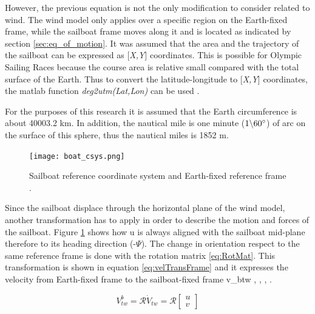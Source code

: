 However, the previous equation is not the only modification to consider related to wind. %
The wind model only applies over a specific region on the Earth-fixed frame, while the sailboat frame moves along it and is located as indicated by section \ref{sec:eq_of_motion}. It was assumed that the area and the trajectory of the sailboat can be expressed as [\textit{X,Y}] coordinates. This is possible for Olympic Sailing Races because the course area is relative small compared with the total surface of the Earth. Thus to convert the latitude-longitude to [\textit{X,Y}] coordinates, the \acrshort{matlab} function \textit{deg2utm(Lat,Lon)} can be used \cite{allsopp1998stochastic}.\par 
\noindent For the purposes of this research it is assumed that the Earth circumference is about 40003.2 km. In addition, the nautical mile is one minute (\textit{$1 \backslash 60 \degree$}) of arc on the surface of this sphere, thus the nautical miles is 1852 m. \par 
\begin{figure}[hbt!]
    \centering
    \texttt{[image: boat\_csys.png]}
    \caption{Sailboat reference coordinate system and Earth-fixed reference frame \cite{keuning2004mathematical}. }
    \label{fig:boat_Csys}
\end{figure}
Since the sailboat displace through the horizontal plane of the wind model, another transformation has to apply in order to describe the motion and forces of the sailboat. Figure \ref{fig:boat_Csys} shows how \acrshort{u} is always aligned with the sailboat mid-plane therefore to its heading direction (-$\Psi$). The change in orientation respect to the same reference frame is done with the rotation matrix \ref{eq:RotMat}. This transformation is shown in equation \ref{eq:velTransFrame} and it expresses the velocity from Earth-fixed frame to the sailboat-fixed frame \acrshort{v_btw} \cite{yang2011control}, \cite{bohm2014velocity}, \cite{Alves2014ASailboat}, \cite{keuning2004mathematical}.\par 
\begin{equation}\label{eq:velTransFrame}
    V_{tw}^b= \mathcal{R} \dot V_{tw}= \mathcal{R}
    \begin{bmatrix}
    u\\
    v
    \end{bmatrix}
\end{equation}

